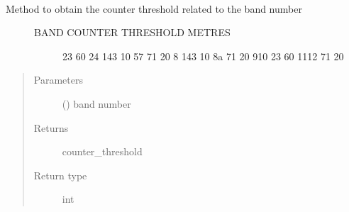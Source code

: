 \begin{fulllineitems}
\label{\detokenize{s2boa.ingestions:s2boa.ingestions.functions.get_centre_name_by_alias}}
\end{fulllineitems}


\begin{fulllineitems}
\label{\detokenize{s2boa.ingestions:s2boa.ingestions.functions.get_centres_conf}}
\end{fulllineitems}


\begin{fulllineitems}
\label{\detokenize{s2boa.ingestions:s2boa.ingestions.functions.get_counter_threshold}}~\begin{description}
\item[{Method to obtain the counter threshold related to the band number}] \leavevmode\begin{description}
\item[{BAND     COUNTER THRESHOLD    METRES}] \leavevmode
{}              23            60
2\sphinxhyphen{}4           143            10
5\sphinxhyphen{}7            71            20
8             143            10
8a             71            20
9\sphinxhyphen{}10           23            60
11\sphinxhyphen{}12          71            20

\end{description}

\end{description}
\begin{quote}\begin{description}
\item[{Parameters}] \leavevmode
\sphinxAtStartPar
{} () \textendash{} band number

\item[{Returns}] \leavevmode
\sphinxAtStartPar
counter\_threshold

\item[{Return type}] \leavevmode
\sphinxAtStartPar
int

\end{description}\end{quote}

\end{fulllineitems}

